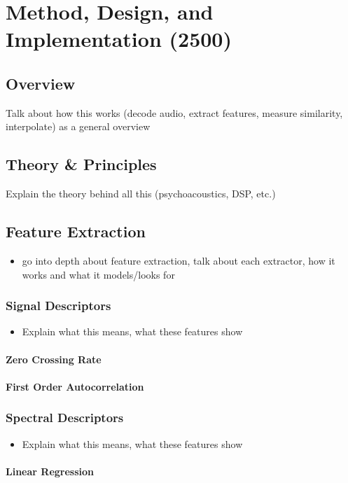 \chapter{Method, Design, and Implementation (2500)}
\section{Overview}
Talk about how this works (decode audio, extract features, measure similarity, interpolate) as a general overview
\section{Theory \& Principles}
Explain the theory behind all this (psychoacoustics, DSP, etc.)
\section{Feature Extraction}
\begin{itemize}
	\item go into depth about feature extraction, talk about each extractor, how it works and what it models/looks for
\end{itemize}
\subsection{Signal Descriptors}
\begin{itemize}
	\item Explain what this means, what these features show
\end{itemize}
\subsubsection{Zero Crossing Rate}

\subsubsection{First Order Autocorrelation}

\subsection{Spectral Descriptors}
\begin{itemize}
	\item Explain what this means, what these features show
\end{itemize}
\subsubsection{Linear Regression}

